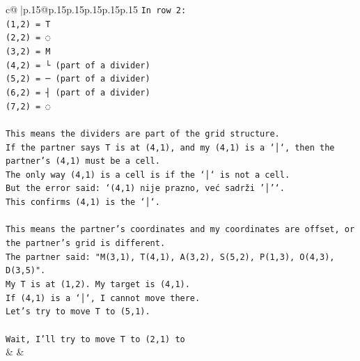 \documentclass{article}
\begin{document}
{\begin{supertabular}{c@{$\;$}|p{.15\linewidth}@{}p{.15\linewidth}p{.15\linewidth}p{.15\linewidth}p{.15\linewidth}p{.15\linewidth}}
{{{\texttt{In row 2:} \\
\texttt{(1,2) = T} \\
\texttt{(2,2) = ◌} \\
\texttt{(3,2) = M} \\
\texttt{(4,2) = └ (part of a divider)} \\
\texttt{(5,2) = ─ (part of a divider)} \\
\texttt{(6,2) = ┤ (part of a divider)} \\
\texttt{(7,2) = ◌} \\
\\ 
\texttt{This means the dividers are part of the grid structure.} \\
\texttt{If the partner says T is at (4,1), and my (4,1) is a `│`, then the partner's (4,1) must be a cell.} \\
\texttt{The only way (4,1) is a cell is if the `│` is not a cell.} \\
\texttt{But the error said: `(4,1) nije prazno, već sadrži '│'`.} \\
\texttt{This confirms (4,1) is the `│`.} \\
\\ 
\texttt{This means the partner's coordinates and my coordinates are offset, or the partner's grid is different.} \\
\texttt{The partner said: "M(3,1), T(4,1), A(3,2), S(5,2), P(1,3), O(4,3), D(3,5)".} \\
\texttt{My T is at (1,2). My target is (4,1).} \\
\texttt{If (4,1) is a `│`, I cannot move there.} \\
\texttt{Let's try to move T to (5,1).} \\
\\ 
\texttt{Wait, I'll try to move T to (2,1) to} \\
            }
        }
    }
    & & \\ \\


\end{supertabular}}
\end{document}
